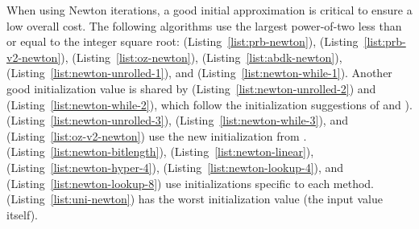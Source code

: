 When using Newton iterations,
a good initial approximation is critical to ensure a low overall cost.
The following algorithms use the largest power-of-two less than or equal
to the integer square root:
\prb{} (Listing~\ref{list:prb-newton}),
\prbTwo{} (Listing~\ref{list:prb-v2-newton}),
\OpenZeppelin{} (Listing~\ref{list:oz-newton}),
\abdk{} (Listing~\ref{list:abdk-newton}),
\UnrolledOne{} (Listing~\ref{list:newton-unrolled-1}), and
\WhileOne{} (Listing~\ref{list:newton-while-1}).
Another good initialization value is shared by
\UnrolledTwo{} (Listing~\ref{list:newton-unrolled-2}) and
\WhileTwo{} (Listing~\ref{list:newton-while-2}),
which follow the initialization suggestions of
\cite[Chapter 1.7, Remarks (2)]{cohen1993} and
\cite[Algorithm 9.2.11]{PrimeNumbersACP2005}).
\UnrolledThree{} (Listing~\ref{list:newton-unrolled-3}),
\WhileThree{} (Listing~\ref{list:newton-while-3}), and
\OpenZeppelinTwo{} (Listing~\ref{list:oz-v2-newton})
use the new initialization from \cite{EfficientIsqrt}.
\BitLength{} (Listing~\ref{list:newton-bitlength}),
\Linear{} (Listing~\ref{list:newton-linear}),
\HyperFour{} (Listing~\ref{list:newton-hyper-4}),
\LookupFour{} (Listing~\ref{list:newton-lookup-4}), and
\LookupEight{} (Listing~\ref{list:newton-lookup-8})
use initializations specific to each method.
\Uniswap{} (Listing~\ref{list:uni-newton}) has the worst
initialization value (the input value itself).
